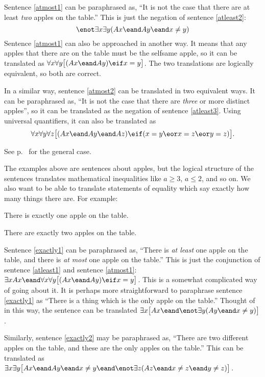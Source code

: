 Sentence \ref{atmost1} can be paraphrased as, ``It is not the case that there are at least \emph{two} apples on the table.'' This is just the negation of sentence \ref{atleast2}: $$\enot \exists x \exists y(Ax \eand Ay \eand x\neq y)$$
Sentence \ref{atmost1} can also be approached in another way. It means that any apples that there are on the table must be the selfsame apple, so it can be translated as $\forall x\forall y\bigl[(Ax \eand Ay) \eif x=y\bigr]$. The two translations are logically equivalent, so both are correct.

In a similar way, sentence \ref{atmost2} can be translated in two equivalent ways. It can be paraphrased as, ``It is not the case that there are \emph{three} or more distinct apples'', so it can be translated as the negation of sentence \ref{atleast3}. Using universal quantifiers, it can also be translated as
$$\forall x\forall y\forall z\bigl[(Ax \eand Ay \eand Az) \eif (x=y \eor x=z \eor y=z)\bigr].$$

See p.~\pageref{summary.atmost} for the general case.

The examples above are sentences about apples, but the logical structure of the sentences translates mathematical inequalities like $a\geq 3$, $a \leq 2$, and so on. We also want to be able to translate statements of equality which say exactly how many things there are. For example:
\begin{kormanize}
\item[\ex{exactly1}] There is exactly one apple on the table.
\item[\ex{exactly2}] There are exactly two apples on the table.
\end{kormanize}

Sentence \ref{exactly1} can be paraphrased as, ``There is \emph{at least} one apple on the table, and there is \emph{at most} one apple on the table.'' This is just the conjunction of sentence \ref{atleast1} and sentence \ref{atmost1}: $\exists x Ax \eand \forall x\forall y\bigl[(Ax \eand Ay) \eif x=y\bigr]$. This is a somewhat complicated way of going about it. It is perhaps more straightforward to paraphrase sentence \ref{exactly1} as ``There is a thing which is the only apple on the table.'' Thought of in this way, the sentence can be translated $\exists x\bigl[Ax \eand \enot\exists y(Ay \eand x\neq y)\bigr]$.

Similarly, sentence \ref{exactly2} may be paraphrased as, ``There are two different apples on the table, and these are the only apples on the table.'' This can be translated as $\exists x\exists y\bigl[Ax \eand Ay \eand x\neq y \eand \enot\exists z(Az \eand x\neq z \eand y\neq z)\bigr]$.

